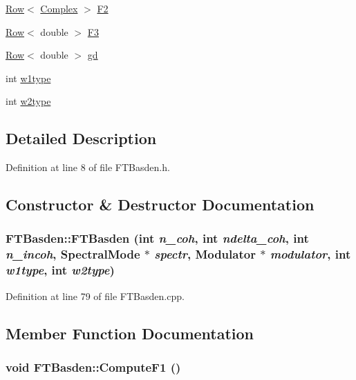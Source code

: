 \begin{DoxyCompactItemize}
\hyperlink{classRow}{Row}$<$ \hyperlink{Matrix_8h_a37333e1628babc1863d6963489e5e9ea}{Complex} $>$ \hyperlink{classFTBasden_a41536d290b26183806301f7601bbeb27}{F2}
\item 
\hyperlink{classRow}{Row}$<$ double $>$ \hyperlink{classFTBasden_ad7ec1f815688a42e02211d7fa98b6a60}{F3}
\item 
\hyperlink{classRow}{Row}$<$ double $>$ \hyperlink{classFTBasden_aecafc948a0316d86977907073b6a6603}{gd}
\item 
int \hyperlink{classFTBasden_abebf10bcdc72528f9c98459e91524545}{w1type}
\item 
int \hyperlink{classFTBasden_ac2f9b89d66840aba0f7ce01e5d3d0386}{w2type}
\end{DoxyCompactItemize}


\subsection{Detailed Description}


Definition at line 8 of file FTBasden.h.



\subsection{Constructor \& Destructor Documentation}
\hypertarget{classFTBasden_a5f5d73040e778dbf7115ab23f6bb9c9d}{
\subsubsection[{FTBasden}]{\setlength{\rightskip}{0pt plus 5cm}FTBasden::FTBasden (int {\em n\_\-coh}, \/  int {\em ndelta\_\-coh}, \/  int {\em n\_\-incoh}, \/  {\bf SpectralMode} $\ast$ {\em spectr}, \/  {\bf Modulator} $\ast$ {\em modulator}, \/  int {\em w1type}, \/  int {\em w2type})}}
\label{classFTBasden_a5f5d73040e778dbf7115ab23f6bb9c9d}


Definition at line 79 of file FTBasden.cpp.



\subsection{Member Function Documentation}
\hypertarget{classFTBasden_a8ccb1870a2b2676f9c8b89a79b80deef}{
\subsubsection[{ComputeF1}]{\setlength{\rightskip}{0pt plus 5cm}void FTBasden::ComputeF1 ()}}
\label{classFTBasden_a8ccb1870a2b2676f9c8b89a79b80deef}


